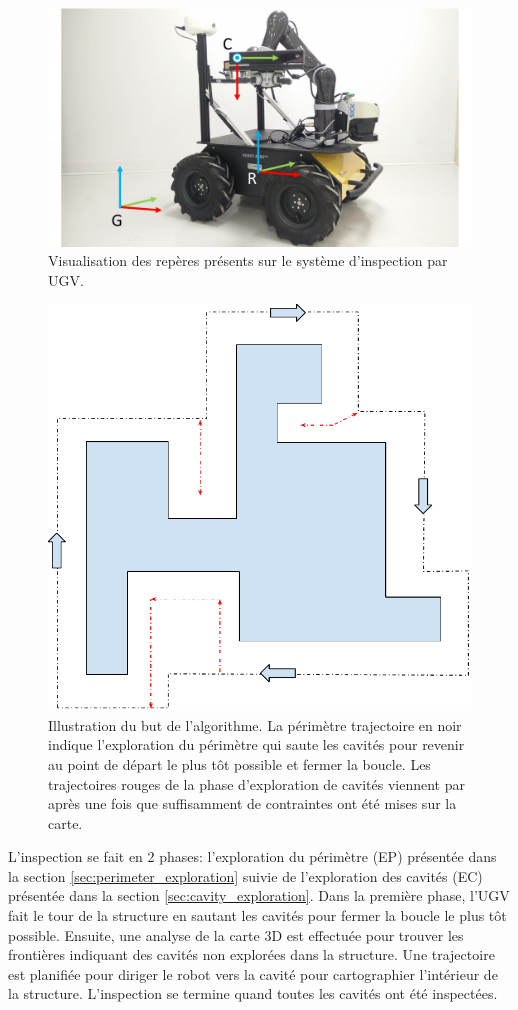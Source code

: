 \begin{figure}[htp]
  \centering
  \includegraphics[width=0.8\linewidth]{images/husky}
  \caption{Visualisation des repères présents sur le système d'inspection par UGV.}
  \label{fig:ugv_frames}
\end{figure}

\begin{figure}[!h]
  \centering
  \includegraphics[width=0.5\linewidth]{images/ugv_goal}
  \caption[Illustration de l'algorithme de cartographie par UGV]{Illustration du but de l'algorithme. La périmètre trajectoire en noir indique l'exploration du périmètre qui saute les cavités pour revenir au point de départ le plus tôt possible et fermer la boucle. Les trajectoires rouges de la phase d'exploration de cavités viennent par après une fois que suffisamment de contraintes ont été mises sur la carte.}
  \label{fig:ugv_overview}
\end{figure}

L'inspection se fait en 2 phases: l'exploration du périmètre (EP) présentée dans la section \ref{sec:perimeter_exploration} suivie de l'exploration des cavités (EC) présentée dans la section \ref{sec:cavity_exploration}. Dans la première phase, l'UGV fait le tour de la structure en sautant les cavités pour fermer la boucle le plus tôt possible. Ensuite, une analyse de la carte 3D est effectuée pour trouver les frontières indiquant des cavités non explorées dans la structure. Une trajectoire est planifiée pour diriger le robot vers la cavité pour cartographier l'intérieur de la structure. L'inspection se termine quand toutes les cavités ont été inspectées.

